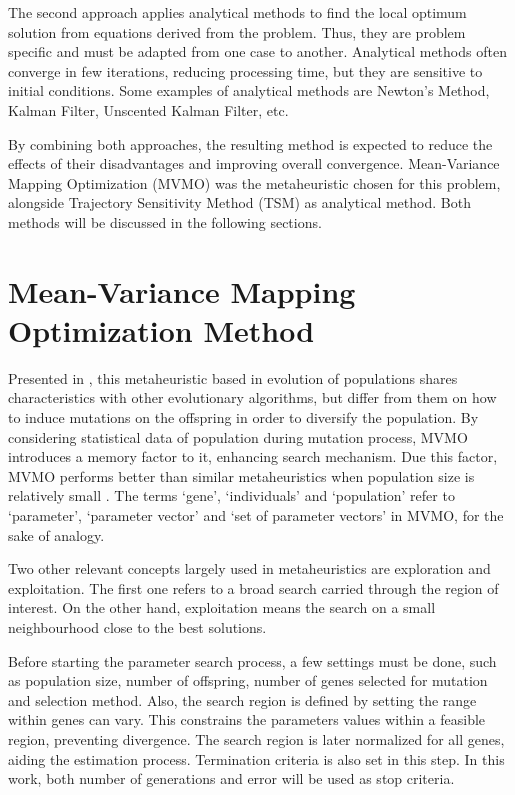 The second approach applies analytical methods to find the local optimum solution from equations derived from the problem. Thus, they are problem specific and must be adapted from one case to another. Analytical methods often converge in few iterations, reducing processing time, but they are sensitive to initial conditions. Some examples of analytical methods are Newton's Method, Kalman Filter, Unscented Kalman Filter, etc.

By combining both approaches, the resulting method is expected to reduce the effects of their disadvantages and improving overall convergence. Mean-Variance Mapping Optimization (MVMO) was the metaheuristic chosen for this problem, alongside Trajectory Sensitivity Method (TSM) as analytical method. Both methods will be discussed in the following sections.

\section{Mean-Variance Mapping Optimization Method}

Presented in \cite{Erlich2010}, this metaheuristic based in evolution of populations shares characteristics with other evolutionary algorithms, but differ from them on how to induce mutations on the offspring in order to diversify the population. By considering statistical data of population during mutation process, MVMO introduces a memory factor to it, enhancing search mechanism. Due this factor, MVMO performs better than similar metaheuristics when population size is relatively small \cite{Nakawiro2011}. The terms `gene', `individuals' and `population' refer to `parameter', `parameter vector' and `set of parameter vectors' in MVMO, for the sake of analogy.

Two other relevant concepts largely used in metaheuristics are exploration and exploitation. The first one refers to a broad search carried through the region of interest. On the other hand, exploitation means the search on a small neighbourhood close to the best solutions.

Before starting the parameter search process, a few settings must be done, such as population size, number of offspring, number of genes selected for mutation and selection method. Also, the search region is defined by setting the range within genes can vary. This constrains the parameters values within a feasible region, preventing divergence. The search region is later normalized for all genes, aiding the estimation process. Termination criteria is also set in this step. In this work, both number of generations and error will be used as stop criteria.

